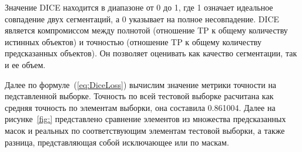 \documentclass[14pt, a4paper]{extreport}
\begin{document}
	Значение DICE находится в диапазоне от 0 до 1, где 1 означает идеальное совпадение двух сегментаций, а 0 указывает на полное несовпадение. DICE является компромиссом между полнотой (отношение TP к общему количеству истинных объектов) и точностью (отношение TP к общему количеству предсказанных объектов). Он позволяет оценивать как качество сегментации, так и ее объем.
	
	Далее по формуле~(\ref{eq:DiceLoss}) вычислим значение метрики точности на педставленной выборке. Точность по всей тестовой выборке расчитана как средняя точность по элементам выборки, она составила 0.861004. Далее на рисунке~\ref{fig:} представлено сравнение элементов из множества предсказанных масок и реальных по соответствующим элементам тестовой выборки, а также разница, представляющая собой исключающее или по маскам.
	
\end{document}
